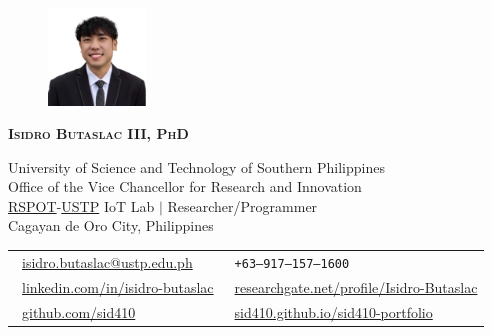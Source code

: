 \documentclass[letterpaper,11pt]{article}
\begin{document}
\begin{figure}
	\vspace{-6pt}
	\hfill\includegraphics[width=0.23\textwidth]{images/my-pic.png}
\end{figure}

{\LARGE \scshape \textbf{Isidro Butaslac III, PhD}} \\

\begin{adjustwidth}{0.3cm}{0cm}

	{University of Science and Technology of Southern Philippines} \\
	{Office of the Vice Chancellor for Research and Innovation} \\
	{\href{https://www.rspotsolutions.com/}{RSPOT}-\href{https://www.ustp.edu.ph/}{USTP} IoT Lab $|$ Researcher/Programmer} \\
	{Cagayan de Oro City, Philippines} \\

	\vspace{3pt}

	\begin{tabular}{@{} l l}
		{\faEnvelope\ \footnotesize\href{mailto:isidro.butaslac@ustp.edu.ph}{isidro.butaslac@ustp.edu.ph} }               &
		{\faPhone\ \footnotesize\texttt{+63--917--157--1600}}                                                                                                         \\

		{\faLinkedin\ \footnotesize\href{https://www.linkedin.com/in/isidro-butaslac/}{linkedin.com/in/isidro-butaslac} } &
		{\resizebox{4mm}{!}{{\faResearchgate}}\ \footnotesize\href{https://www.researchgate.net/profile/Isidro-Butaslac/}{researchgate.net/profile/Isidro-Butaslac} } \\

		{\faGithub\ \footnotesize\href{https://github.com/sid410}{github.com/sid410} }                                    &
		{\faBriefcase\ \footnotesize\href{https://sid410.github.io/sid410-portfolio/}{sid410.github.io/sid410-portfolio} }                                            \\
	\end{tabular}

\end{adjustwidth}
\end{document}
